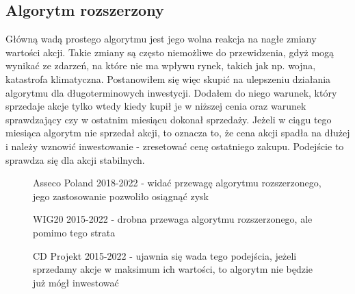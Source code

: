 \documentclass{article}
\begin{document}
    \subsection{Algorytm rozszerzony}
    Główną wadą prostego algorytmu jest jego wolna reakcja na nagłe zmiany wartości akcji. Takie zmiany są często niemożliwe do przewidzenia, gdyż mogą wynikać 
    ze zdarzeń, na które nie ma wpływu rynek, takich jak np. wojna, katastrofa klimatyczna. Postanowiłem się więc skupić na ulepszeniu działania algorytmu dla długoterminowych inwestycji.
    Dodałem do niego warunek, który sprzedaje akcje tylko wtedy kiedy kupił je w niższej cenia oraz warunek sprawdzający czy w ostatnim miesiącu dokonał sprzedaży.
    Jeżeli w ciągu tego miesiąca algorytm nie sprzedał akcji, to oznacza to, że cena akcji spadła na dłużej i należy wznowić inwestowanie - zresetować cenę ostatniego zakupu.
    Podejście to sprawdza się dla akcji stabilnych.
    \begin{figure}[H]
        \noindent{}
        \caption{Asseco Poland 2018-2022 - widać przewagę algorytmu rozszerzonego,
        jego zastosowanie pozwoliło osiągnąć zysk}
    \end{figure}
    \begin{figure}[H]
        \noindent{}
        \caption{WIG20 2015-2022 - drobna przewaga algorytmu rozszerzonego, ale pomimo tego strata}
    \end{figure}
    \begin{figure}[H]
        \noindent{}
        \caption{CD Projekt 2015-2022 - ujawnia się wada tego podejścia, jeżeli sprzedamy akcje w maksimum ich wartości, to algorytm nie będzie już mógł inwestować}
    \end{figure}
\end{document}
